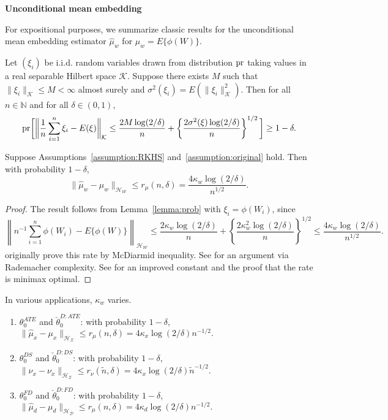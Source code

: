 \textbf{Unconditional mean embedding}

For expositional purposes, we summarize classic results for the unconditional mean embedding estimator $\hat{\mu}_w$ for $\mu_w=E\{\phi(W)\}$.

\begin{lemma}\label{lemma:prob}
Let $(\xi_i)$ be i.i.d. random variables drawn from distribution $\text{\normalfont pr}$ taking values in a real separable Hilbert space $\mathcal{K}$. Suppose there exists $ M$ such that
$
    \|\xi_i\|_{\mathcal{K}} \leq M<\infty$ almost surely and $
    \sigma^2(\xi_i)=E(\|\xi_i\|_{\mathcal{K}}^2)$. Then for all $n\in\mathbb{N}$ and for all $\delta\in(0,1)$,
$$
\text{\normalfont pr}\bigg[\bigg\|\dfrac{1}{n}\sum_{i=1}^n\xi_i-E(\xi)\bigg\|_{\mathcal{K}}\leq\dfrac{2M\log(2/\delta)}{n}+\left\{\dfrac{2\sigma^2(\xi)\log(2/\delta)}{n}\right\}^{1/2}\bigg]\geq 1-\delta.
$$
\end{lemma}

\begin{proposition}\label{theorem:mean}
Suppose Assumptions~\ref{assumption:RKHS} and~\ref{assumption:original} hold. Then with probability $1-\delta$, 
$$
\|\hat{\mu}_w-\mu_w\|_{\mathcal{H}_{\mathcal{W}}}\leq r_{\mu}(n,\delta)=\frac{4\kappa_w \log(2/\delta)}{n^{1/2}}.
$$
\end{proposition}

\begin{proof}
The result follows from Lemma~\ref{lemma:prob} with $\xi_i=\phi(W_i)$, since
$$
\left\|n^{-1}\sum_{i=1}^n \phi(W_i)-E\{\phi(W)\}\right\|_{\mathcal{H}_{\mathcal{W}}}
\leq \frac{2 \kappa_w\log(2/\delta)}{n}+\left\{\dfrac{2\kappa^2_w\log(2/\delta)}{n}\right\}^{1/2}\leq \frac{4\kappa_w \log(2/\delta)}{n^{1/2}}.
$$
\cite[Theorem 15]{altun2006unifying} originally prove this rate by McDiarmid inequality. See \cite[Theorem 2]{smola2007hilbert} for an argument via Rademacher complexity. See \cite[Proposition A.1]{tolstikhin2017minimax} for an improved constant and the proof that the rate is minimax optimal.
\end{proof}

\begin{remark}\label{remark:2}
In various applications, $\kappa_w$ varies.
    \begin{enumerate}
        \item $\theta_0^{ATE}$ and $\check{\theta}_0^{D:ATE}$: with probability $1-\delta$, $
\|\hat{\mu}_x-\mu_x\|_{\mathcal{H}_{\mathcal{X}}}\leq r_{\mu}(n,\delta)=4\kappa_x \log(2/\delta)n^{-1/2}.
$
        \item $\theta_0^{DS}$ and $\check{\theta}_0^{D:DS}$: with probability $1-\delta$, 
$
\|\hat{\nu}_x-\nu_x\|_{\mathcal{H}_{\mathcal{X}}}\leq r_{\nu}(\tilde{n},\delta)=4\kappa_x \log(2/\delta)\tilde{n}^{-1/2}.
$
 \item $\theta_0^{FD}$ and $\check{\theta}_0^{D:FD}$: with probability $1-\delta$, 
$
\|\hat{\mu}_d-\mu_d\|_{\mathcal{H}_{\mathcal{D}}}\leq r_{\mu}(n,\delta)=4\kappa_d \log(2/\delta)n^{-1/2}.
$
    \end{enumerate}
\end{remark}

